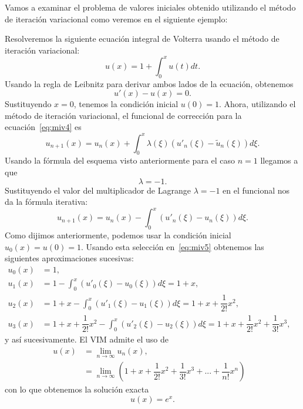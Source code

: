 Vamos a examinar el problema de valores iniciales obtenido utilizando el método de iteración variacional como veremos en el siguiente ejemplo:
\begin{ejemplo}
	Resolveremos la siguiente ecuación integral de Volterra usando el método de iteración variacional:
	\begin{equation}
		u(x) = 1 + \int_{0}^{x}u(t)dt.
	\end{equation}
	Usando la regla de Leibnitz para derivar ambos lados de la ecuación, obtenemos
	\begin{equation}\label{eq:miv4}
		u'(x) - u(x) = 0.
	\end{equation}
	Sustituyendo $x = 0$, tenemos la condición inicial $u(0) = 1.$ Ahora, utilizando el método de iteración variacional, el funcional de corrección para la ecuación~\eqref{eq:miv4} es
	\begin{equation}\label{eq:miv5}
		u_{n+1}(x) = u_n(x) + \int_{0}^{x} \lambda (\xi) (u'_n(\xi) - \tilde{u}_n(\xi))d\xi.
	\end{equation}
	Usando la fórmula del esquema visto anteriormente para el caso $n = 1$ llegamos a que 
	\begin{equation}
		\lambda = -1.
	\end{equation}
	Sustituyendo el valor del multiplicador de Lagrange $\lambda = -1$ en el funcional nos da la fórmula iterativa:
	\begin{equation}
		u_{n+1}(x) = u_n(x) - \int_{0}^{x} (u'_n(\xi) - u_n(\xi))d\xi.
	\end{equation}
	Como dijimos anteriormente, podemos usar la condición inicial $u_0(x) = u(0) = 1.$ Usando esta selección en~\eqref{eq:miv5} obtenemos las siguientes aproximaciones sucesivas:
	\begin{align}
		u_0(x) &= 1,      &   \\
		u_1(x) &= 1 - \int_{0}^{x} (u'_0(\xi) - u_0(\xi))d\xi = 1 + x,    & \\
		u_2(x) &= 1 + x - \int_{0}^{x} (u'_1(\xi) - u_1(\xi))d\xi = 1 + x + \dfrac{1}{2!}x^2,    & \\
		u_3(x) &= 1 + x + \dfrac{1}{2!}x^2 - \int_{0}^{x} (u'_2(\xi) - u_2(\xi))d\xi = 1 + x + \dfrac{1}{2!}x^2 + \dfrac{1}{3!}x^3,    &
	\end{align}
	y así sucesivamente. El VIM admite el uso de 
	\begin{align}
		u(x) &= \lim_{n \rightarrow \infty} u_n(x),      &   \\
		&= \lim_{n \rightarrow \infty} (1 + x + \dfrac{1}{2!}x^2 + \dfrac{1}{3!}x^3 + ... + \dfrac{1}{n!}x^n)
	\end{align}
	con lo que obtenemos la solución exacta
	\begin{equation}
		u(x) = e^x.
	\end{equation}
\end{ejemplo}

